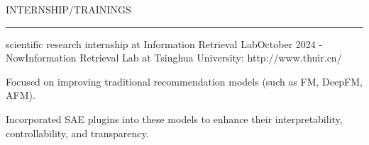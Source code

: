 \documentclass{resume} %
\renewenvironment{rSection}[1]{
\sectionskip
\textcolor{TsinghuaPurple}{\MakeUppercase{#1}}
\sectionlineskip
\hrule
\begin{list}{}{
\setlength{\leftmargin}{0em}
}
\item[]
}{
\end{list}
}
\begin{document}
\begin{rSection}{INTERNSHIP/TRAININGS}
\begin{rSubsection}{scientific research internship at Information Retrieval Lab}{October 2024 - Now}{Information Retrieval Lab at Tsinghua University: http://www.thuir.cn/}{}              
\item Focused on improving traditional recommendation models (such as FM, DeepFM, AFM).
\item Incorporated SAE plugins into these models to enhance their interpretability, controllability, and transparency.
\end{rSubsection}  

\end{rSection}

  
\end{document}
